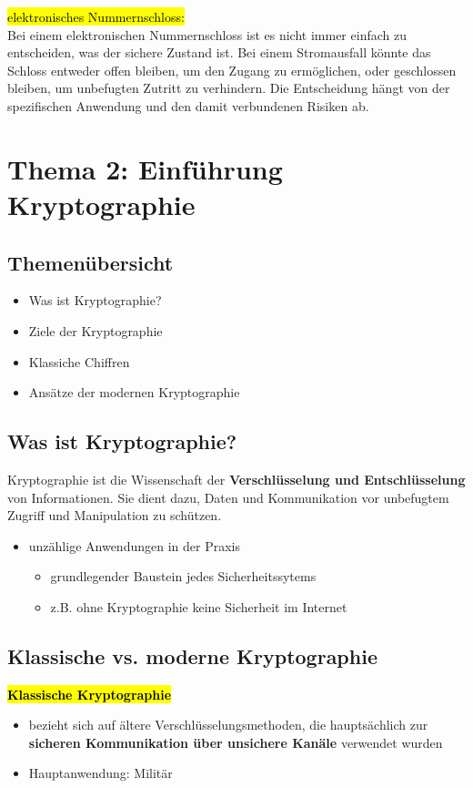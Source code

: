 \documentclass[a4paper, 10pt]{article}
\begin{document}
 \noindent\hl{elektronisches Nummernschloss:}\\
 Bei einem elektronischen Nummernschloss ist es nicht immer einfach zu entscheiden, was der sichere Zustand ist. Bei einem Stromausfall könnte das Schloss entweder offen bleiben, um den Zugang zu ermöglichen, oder geschlossen bleiben, um unbefugten Zutritt zu verhindern. Die Entscheidung hängt von der spezifischen Anwendung und den damit verbundenen Risiken ab.

 \section{Thema 2: Einführung Kryptographie}
 \subsection{Themenübersicht}
 \begin{itemize}
     \item Was ist Kryptographie?
     \item Ziele der Kryptographie
     \item Klassiche Chiffren
     \item Ansätze der modernen Kryptographie
 \end{itemize}
 \subsection{Was ist Kryptographie?}
 Kryptographie ist die Wissenschaft der \textbf{Verschlüsselung und Entschlüsselung} von Informationen. Sie dient dazu, Daten und Kommunikation vor unbefugtem Zugriff und Manipulation zu schützen. 
\begin{itemize}
    \item unzählige Anwendungen in der Praxis
    \begin{itemize}
        \item grundlegender Baustein jedes Sicherheitssytems
        \item z.B. ohne Kryptographie keine Sicherheit im Internet
    \end{itemize}
\end{itemize}
\subsection{Klassische vs. moderne Kryptographie}
\hl{\textbf{Klassische Kryptographie}}
\begin{itemize}
    \item  bezieht sich auf ältere Verschlüsselungsmethoden, die hauptsächlich zur \textbf{sicheren Kommunikation über unsichere Kanäle} verwendet wurden
    \item Hauptanwendung: Militär
\end{itemize}
\end{document}
